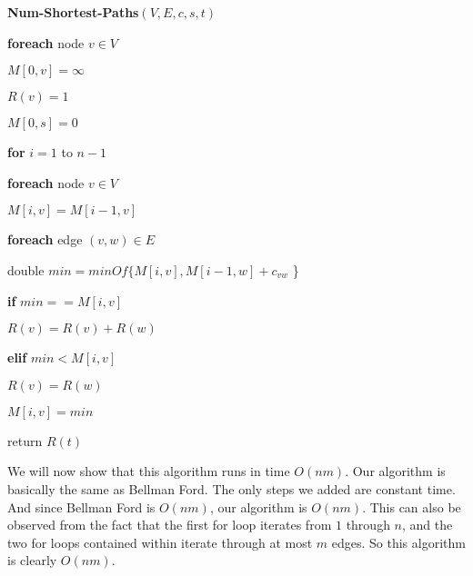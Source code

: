\documentclass{article}
\begin{document}
\vspace{5mm}
\noindent \textbf{Num-Shortest-Paths}$(V, E, c, s, t)$
\begin{enumerate}
    \item \textbf{foreach} node $v \in V$
    {\setlength\itemindent{25pt} \item $M[0,v] = \infty$ }
    {\setlength\itemindent{25pt} \item $R(v) = 1$ }
    \item $M[0,s] = 0$
    {\setlength\itemindent{25pt} \item \textbf{for} $i=1$ to $n-1$ }
    {\setlength\itemindent{50pt} \item \textbf{foreach} node $v \in V$ }
    {\setlength\itemindent{75pt} \item $M[i,v] = M[i-1,v]$ }
    {\setlength\itemindent{75pt} \item \textbf{foreach} edge $(v,w) \in E$ }
    {\setlength\itemindent{100pt} \item double $min = minOf\{M[i,v], M[i-1,w] +
            c_{vw}$ \} }
    {\setlength\itemindent{100pt} \item \textbf{if} $min == M[i,v]$ }
    {\setlength\itemindent{125pt} \item $R(v) = R(v) + R(w)$ }
    {\setlength\itemindent{100pt} \item \textbf{elif} $min < M[i,v]$ }
    {\setlength\itemindent{125pt} \item $R(v) = R(w)$ }
    {\setlength\itemindent{100pt} \item $M[i,v] = min$ }
    \item return $R(t)$
\end{enumerate}
    We will now show that this algorithm runs in time $O(nm)$. Our algorithm is
    basically the same as Bellman Ford. The only steps we added are constant
    time. And since Bellman Ford is $O(nm)$, our algorithm is $O(nm)$. This can
    also be observed from the fact that the first for loop iterates from $1$
    through $n$, and the two for loops contained within iterate through at most
    $m$ edges. So this algorithm is clearly $O(nm)$.
\end{document}
